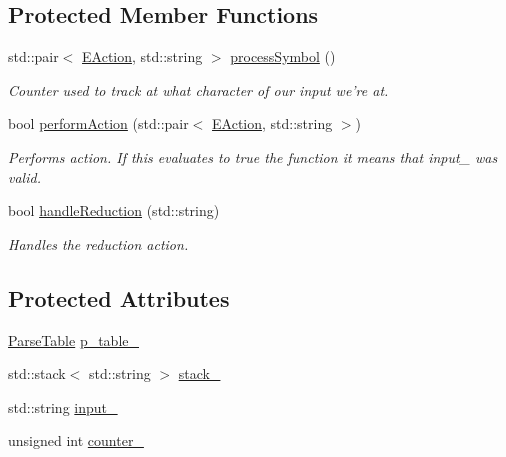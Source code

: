 \subsection*{\-Protected \-Member \-Functions}
\begin{DoxyCompactItemize}
\item 
std\-::pair$<$ \hyperlink{ParseTable_8h_a81d4868b129e5f45325894085a36a8a5}{\-E\-Action}, std\-::string $>$ \hyperlink{classLRParser_a3bd6bff5276c4ee9b592a14e31e789b3}{process\-Symbol} ()
\begin{DoxyCompactList}\small\item\em \-Counter used to track at what character of our input we're at. \end{DoxyCompactList}\item 
bool \hyperlink{classLRParser_aa2a11e0af8cbc1bb23b522f1a2ca87e5}{perform\-Action} (std\-::pair$<$ \hyperlink{ParseTable_8h_a81d4868b129e5f45325894085a36a8a5}{\-E\-Action}, std\-::string $>$)
\begin{DoxyCompactList}\small\item\em \-Performs action. \-If this evaluates to true the function it means that input\-\_\- was valid. \end{DoxyCompactList}\item 
bool \hyperlink{classLRParser_ab355d762edcb2c7da1f30728d08b43a1}{handle\-Reduction} (std\-::string)
\begin{DoxyCompactList}\small\item\em \-Handles the reduction action. \end{DoxyCompactList}\end{DoxyCompactItemize}
\subsection*{\-Protected \-Attributes}
\begin{DoxyCompactItemize}
\item 
\hyperlink{classParseTable}{\-Parse\-Table} \hyperlink{classLRParser_a111f4dd04eb42896c7c31bd1a255a58b}{p\-\_\-table\-\_\-}
\item 
std\-::stack$<$ std\-::string $>$ \hyperlink{classLRParser_a98af41152079cb4f2fe7f280629cf18c}{stack\-\_\-}
\item 
std\-::string \hyperlink{classLRParser_a8dc38b1c7c3a3aa80abbd48ee2364319}{input\-\_\-}
\item 
unsigned int \hyperlink{classLRParser_acd3eab842429e90bd7dc0433274e0a37}{counter\-\_\-}
\end{DoxyCompactItemize}
